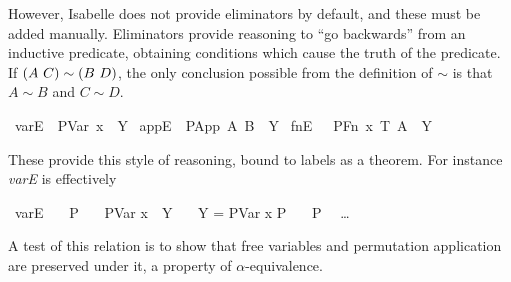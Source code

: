 However, Isabelle does not provide eliminators by default, and these must be added manually.
Eliminators provide reasoning to ``go backwards'' from an inductive predicate, obtaining conditions which cause the truth of the predicate.
If \(\left(A\ C\right) \sim \left(B\ D\right)\), the only conclusion possible from the definition of \(\sim\) is that \(A \sim B\) and \(C \sim D\).

\begin{implementation}
\isamarkupfalse%
\ varE{\isacharcolon}\ \ {\isachardoublequoteopen}PVar\ x\ {\isasymapprox}\ Y{\isachardoublequoteclose}\isanewline
{}\isamarkupfalse%
\ appE{\isacharcolon}\ \ {\isachardoublequoteopen}PApp\ A\ B\ {\isasymapprox}\ Y{\isachardoublequoteclose}\isanewline
{}\isamarkupfalse%
\ fnE{\isacharcolon}\ \ \ {\isachardoublequoteopen}PFn\ x\ T\ A\ {\isasymapprox}\ Y{\isachardoublequoteclose}
\end{implementation}

These provide this style of reasoning, bound to labels as a theorem.
For instance \emph{varE} is effectively

\begin{implementation}
\isamarkupfalse%
\ varE\isanewline
\ \ \ P\isanewline
\ \ \ {\isachardoublequoteopen}PVar x\ {\isasymapprox}\ Y{\isachardoublequoteclose}\isanewline
\ \ \ {\isachardoublequoteopen}Y = PVar x {\isasymLongrightarrow} P{\isachardoublequoteclose}\isanewline
\ \ \ {\isachardoublequoteopen}P{\isachardoublequoteclose}\isanewline
{}\isanewline
\ \ \ldots\isanewline
{}
\end{implementation}

A test of this relation is to show that free variables and permutation application are preserved under it, a property of \(\alpha\)-equivalence.

